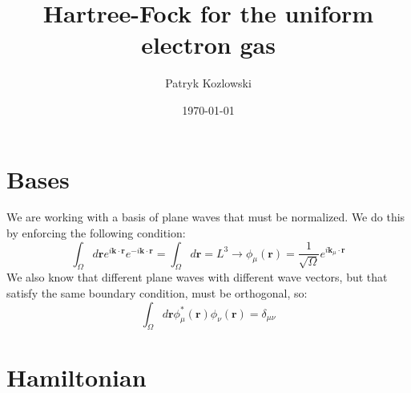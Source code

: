 \documentclass[12pt]{article}
\author{Patryk Kozlowski}
\title{Hartree-Fock for the uniform electron gas}
\date{\today}
\begin{document}
\maketitle
\section{Bases}
We are working with a basis of plane waves that must be normalized. We do this by enforcing the following condition:
\begin{equation}
    \int_{\Omega } d\mathbf{r} e^{i\mathbf{k}\cdot\mathbf{r}} e^{-i\mathbf{k}\cdot\mathbf{r}} = \int_{\Omega }d\mathbf{r} = L^3 \rightarrow \phi_\mu(\mathbf{r}) = \frac{1}{\sqrt{\Omega }} e^{i\mathbf{k}_\mu\cdot\mathbf{r}}
\end{equation}
We also know that different plane waves with different wave vectors, but that satisfy the same boundary condition, must be orthogonal, so:
\begin{equation}
    \int_{\Omega } d\mathbf{r} \phi^*_\mu(\mathbf{r}) \phi_\nu(\mathbf{r}) = \delta_{\mu\nu}
\end{equation}

\section{Hamiltonian}
\end{document}
